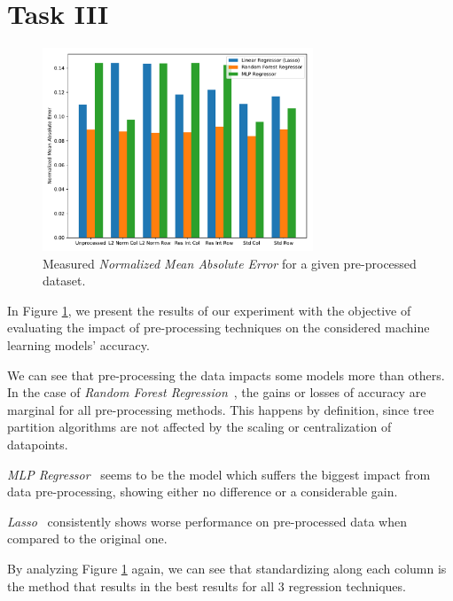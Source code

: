 \documentclass[10pt]{article}
\begin{document}
\section*{Task III}
\label{sec:7}

\begin{figure}[h!]
    \centering
    \captionsetup{justification=centering}
    \includegraphics[width=0.72\textwidth,height=\textheight,keepaspectratio]{../result/project1/pre_processing_accuracies.pdf}
    \caption{Measured \textit{Normalized Mean Absolute Error} for a given pre-processed dataset.}
    \label{fig:6}
\end{figure}

In Figure \ref{fig:6}, we present the results of our experiment with the objective of evaluating the impact of pre-processing techniques on the considered machine learning models' accuracy.

We can see that pre-processing the data impacts some models more than others.
In the case of \textit{Random Forest Regression}~\cite{RFR}, the gains or losses of accuracy are marginal for all pre-processing methods. This happens by definition, since tree partition algorithms are not affected by the scaling or centralization of datapoints.

\textit{MLP Regressor}~\cite{MLPR} seems to be the model which suffers the biggest impact from data pre-processing, showing either no difference or a considerable gain.

\textit{Lasso}~\cite{Lasso} consistently shows worse performance on pre-processed data when compared to the original one.

By analyzing Figure \ref{fig:6} again, we can see that standardizing along each column is the method that results in the best results for all 3 regression techniques.

\pagebreak
\end{document}
